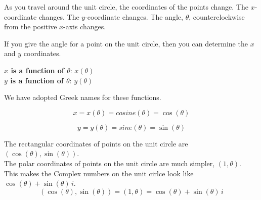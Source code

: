 \documentclass{ximera}
\begin{document}
\qquad


As you travel around the unit circle, the coordinates of the points change. The $x$-coordinate changes.  The $y$-coordinate changes. The angle, $\theta$, counterclockwise from the positive $x$-axis changes.   

If you give the angle for a point on the unit circle, then you can determine the $x$ and $y$ coordinates.


\begin{center}

\textbf{\textcolor{blue!55!black}{$x$ is a function of $\theta$}}: $x(\theta)$ \\

\textbf{\textcolor{blue!55!black}{$y$ is a function of $\theta$}}: $y(\theta)$ \\

\end{center}




We have adopted Greek names for these functions.



\[
x = x(\theta) = cosine(\theta) = \cos(\theta)
\]




\[
y = y(\theta) = sine(\theta) = \sin(\theta)
\]



The rectangular coordinates of points on the unit circle are $(\cos(\theta), \sin(\theta))$. \\

The polar coordinates of points on the unit circle are much simpler, $(1, \theta)$. \\

This makes the Complex numbers on the unit cirlce look like $\cos(\theta) + \sin(\theta) \, i$. \\




\[
(\cos(\theta), \sin(\theta)) = (1, \theta) = \cos(\theta) + \sin(\theta) \, i
\]
\end{document}
